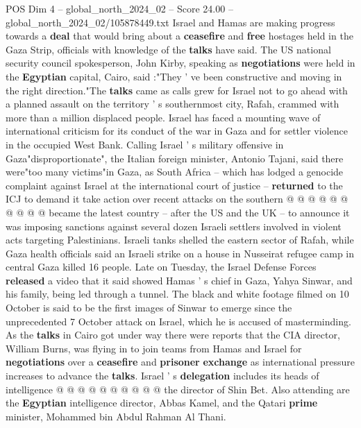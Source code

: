 \begin{textsample}{POS Dim 4 – global\_north\_2024\_02 – Score 24.00 – global\_north\_2024\_02/105878449.txt}  \label{ex:f4_pos_184}
Israel and Hamas are making progress towards a \textbf{deal} that would bring about a \textbf{ceasefire} and \textbf{free} hostages held in the Gaza Strip, officials with knowledge of the \textbf{talks} have said.
The US national security council spokesperson, John Kirby, speaking as \textbf{negotiations} were held in the \textbf{Egyptian} capital, Cairo, said :"They ' ve been constructive and moving in the right direction."The \textbf{talks} came as calls grew for Israel not to go ahead with a planned assault on the territory ' s southernmost city, Rafah, crammed with more than a million displaced people.
Israel has faced a mounting wave of international criticism for its conduct of the war in Gaza and for settler violence in the occupied West Bank.
Calling Israel ' s military offensive in Gaza"disproportionate", the Italian foreign minister, Antonio Tajani, said there were"too many victims"in Gaza, as South Africa -- which has lodged a genocide complaint against Israel at the international court of justice -- \textbf{returned} to the ICJ to demand it take action over recent attacks on the southern @ @ @ @ @ @ @ @ @ @ became the latest country -- after the US and the UK -- to announce it was imposing sanctions against several dozen Israeli settlers involved in violent acts targeting Palestinians.
Israeli tanks shelled the eastern sector of Rafah, while Gaza health officials said an Israeli strike on a house in Nusseirat refugee camp in central Gaza killed 16 people.
Late on Tuesday, the Israel Defense Forces \textbf{released} a video that it said showed Hamas ' s chief in Gaza, Yahya Sinwar, and his family, being led through a tunnel.
The black and white footage filmed on 10 October is said to be the first images of Sinwar to emerge since the unprecedented 7 October attack on Israel, which he is accused of masterminding.
As the \textbf{talks} in Cairo got under way there were reports that the CIA director, William Burns, was flying in to join teams from Hamas and Israel for \textbf{negotiations} over a \textbf{ceasefire} and \textbf{prisoner} \textbf{exchange} as international pressure increases to advance the \textbf{talks}.
Israel ' s \textbf{delegation} includes its heads of intelligence @ @ @ @ @ @ @ @ @ @ the director of Shin Bet.
Also attending are the \textbf{Egyptian} intelligence director, Abbas Kamel, and the Qatari \textbf{prime} minister, Mohammed bin Abdul Rahman Al Thani.

\end{textsample}
